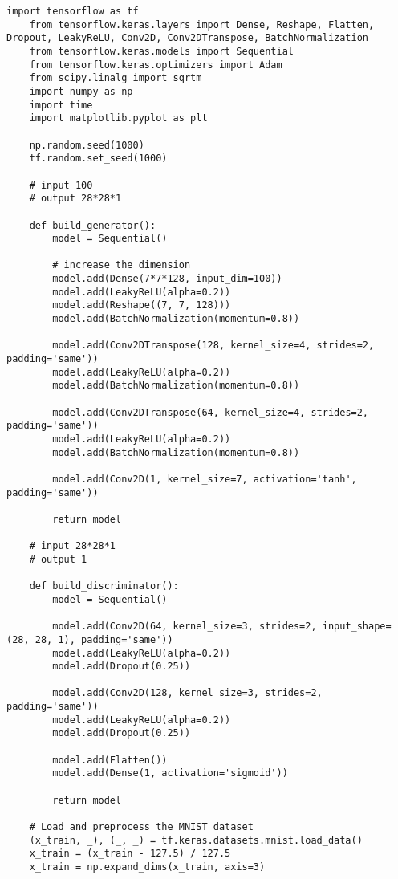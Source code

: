 \begin{lstlisting}[style=mypython, caption=GAN Model with Convolutional Layers]
    import tensorflow as tf
    from tensorflow.keras.layers import Dense, Reshape, Flatten, Dropout, LeakyReLU, Conv2D, Conv2DTranspose, BatchNormalization
    from tensorflow.keras.models import Sequential
    from tensorflow.keras.optimizers import Adam
    from scipy.linalg import sqrtm
    import numpy as np
    import time
    import matplotlib.pyplot as plt
    
    np.random.seed(1000)
    tf.random.set_seed(1000)
    
    # input 100
    # output 28*28*1
    
    def build_generator():
        model = Sequential()
        
        # increase the dimension
        model.add(Dense(7*7*128, input_dim=100))
        model.add(LeakyReLU(alpha=0.2))
        model.add(Reshape((7, 7, 128)))
        model.add(BatchNormalization(momentum=0.8))
    
        model.add(Conv2DTranspose(128, kernel_size=4, strides=2, padding='same'))
        model.add(LeakyReLU(alpha=0.2))
        model.add(BatchNormalization(momentum=0.8))
    
        model.add(Conv2DTranspose(64, kernel_size=4, strides=2, padding='same'))
        model.add(LeakyReLU(alpha=0.2))
        model.add(BatchNormalization(momentum=0.8))
    
        model.add(Conv2D(1, kernel_size=7, activation='tanh', padding='same'))
    
        return model
    
    # input 28*28*1
    # output 1
    
    def build_discriminator():
        model = Sequential()
        
        model.add(Conv2D(64, kernel_size=3, strides=2, input_shape=(28, 28, 1), padding='same'))
        model.add(LeakyReLU(alpha=0.2))
        model.add(Dropout(0.25))
    
        model.add(Conv2D(128, kernel_size=3, strides=2, padding='same'))
        model.add(LeakyReLU(alpha=0.2))
        model.add(Dropout(0.25))
    
        model.add(Flatten())
        model.add(Dense(1, activation='sigmoid'))
    
        return model
    
    # Load and preprocess the MNIST dataset
    (x_train, _), (_, _) = tf.keras.datasets.mnist.load_data()
    x_train = (x_train - 127.5) / 127.5
    x_train = np.expand_dims(x_train, axis=3)
    

\end{lstlisting}
